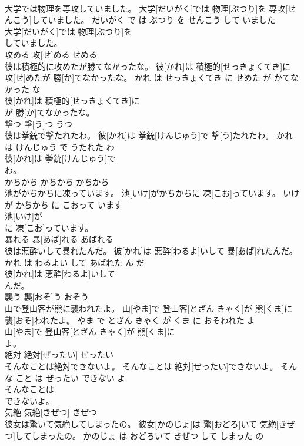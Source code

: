 \documentclass[8pt]{extreport}
\begin{document}
\begin{CJK}{UTF8}{min}
\\	大学では物理を専攻していました。	大学[だいがく]では 物理[ぶつり]を 専攻[せんこう]していました。	だいがく で は ぶつり を せんこう して いました	
\\	大学[だいがく]では 物理[ぶつり]を
\\	していました。			
\\	攻める	攻[せ]める	せめる	
\\	彼は積極的に攻めたが勝てなかったな。	彼[かれ]は 積極的[せっきょくてき]に 攻[せ]めたが 勝[か]てなかったな。	かれ は せっきょくてき に せめた が かてなかった な	
\\	彼[かれ]は 積極的[せっきょくてき]に
\\	が 勝[か]てなかったな。			
\\	撃つ	撃[う]つ	うつ	
\\	彼は拳銃で撃たれたわ。	彼[かれ]は 拳銃[けんじゅう]で 撃[う]たれたわ。	かれ は けんじゅう で うたれた わ	
\\	彼[かれ]は 拳銃[けんじゅう]で
\\	わ。			
\\	かちかち	かちかち	かちかち	
\\	池がかちかちに凍っています。	池[いけ]がかちかちに 凍[こお]っています。	いけ が かちかち に こおって います	
\\	池[いけ]が
\\	に 凍[こお]っています。			
\\	暴れる	暴[あば]れる	あばれる	
\\	彼は悪酔いして暴れたんだ。	彼[かれ]は 悪酔[わるよ]いして 暴[あば]れたんだ。	かれ は わるよい して あばれた ん だ	
\\	彼[かれ]は 悪酔[わるよ]いして
\\	んだ。			
\\	襲う	襲[おそ]う	おそう	
\\	山で登山客が熊に襲われたよ。	山[やま]で 登山客[とざん きゃく]が 熊[くま]に 襲[おそ]われたよ。	やま で とざん きゃく が くま に おそわれた よ	
\\	山[やま]で 登山客[とざん きゃく]が 熊[くま]に
\\	よ。			
\\	絶対	絶対[ぜったい]	ぜったい	
\\	そんなことは絶対できないよ。	そんなことは 絶対[ぜったい]できないよ。	そんな こと は ぜったい できない よ	
\\	そんなことは
\\	できないよ。			
\\	気絶	気絶[きぜつ]	きぜつ	
\\	彼女は驚いて気絶してしまったの。	彼女[かのじょ]は 驚[おどろ]いて 気絶[きぜつ]してしまったの。	かのじょ は おどろいて きぜつ して しまった の	

\end{CJK}
\end{document}
